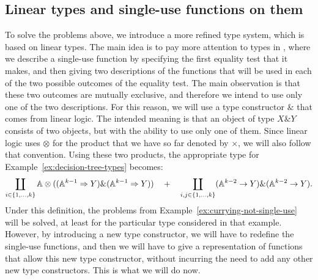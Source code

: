 \documentclass[a4paper,UKenglish,cleveref, autoref, numberwithinsect, thm-restate]{lipics-v2021}
\begin{document}
\subsection{Linear types and single-use functions on them}
\label{sec:linear-types-and-single-use-functions}
To solve the problems above, we introduce a more refined type system, which is based on linear types.  The main idea is to pay more attention to types in , where we describe a single-use function by specifying the first equality test that it makes, and then giving two descriptions of the functions that will be used in each of the two possible outcomes of the equality test. The main observation is that these two outcomes are mutually exclusive, and therefore we intend to use only one of the two descriptions. For this reason, we will use a  type constructor $\&$ that comes from linear logic. The intended meaning is  that an object of type $X \& Y$ consists of two objects, but with the ability to use only one of them. Since linear logic uses $\otimes$  for the  product that we have so far denoted by $\times$, we will also follow that convention. Using these two products, the appropriate type for Example~\ref{ex:decision-tree-types} becomes:
\begin{align*}
\coprod_{i \in \{1,\ldots,k\}} 
        \mathbb A \otimes ((\mathbb A^{k-1} \Rightarrow Y) \& (\mathbb A^{k-1} \Rightarrow Y))
          \quad + \quad 
    \coprod_{i, j \in \{1,\ldots,k\}} (\mathbb A^{k-2} \to Y) \& (\mathbb A^{k-2} \to Y).
    \end{align*}
Under this definition, the problems from Example~\ref{ex:currying-not-single-use} will be solved, at least for the particular type considered in that example. However, by introducing a new type constructor, we will have to redefine the single-use functions, and then we will have to give a representation of functions that allow this new type constructor, without incurring the need to add any other new type constructors. This is what we will do now.
\end{document}
